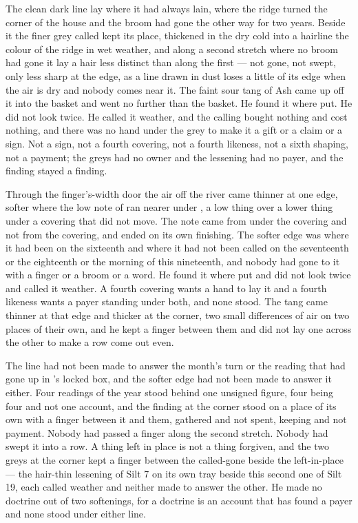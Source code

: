 The clean dark line lay where it had always lain, where the  ridge turned the corner of the house and the broom had gone the other way for two years. Beside it the finer grey called  kept its place, thickened in the dry cold into a hairline the colour of the ridge in wet weather, and along a second stretch where no broom had gone it lay a hair less distinct than along the first --- not gone, not swept, only less sharp at the edge, as a line drawn in dust loses a little of its edge when the air is dry and nobody comes near it. The faint sour tang of Ash came up off it into the basket and went no further than the basket. He found it where put. He did not look twice. He called it weather, and the calling bought nothing and cost nothing, and there was no hand under the grey to make it a gift or a claim or a sign. Not a sign, not a fourth covering, not a fourth likeness, not a sixth shaping, not a payment; the greys had no owner and the lessening had no payer, and the finding stayed a finding.

Through the finger's-width door the air off the river came thinner at one edge, softer where the low note of  ran nearer under , a low thing over a lower thing under a covering that did not move. The note came from under the covering and not from the covering, and ended on its own finishing. The softer edge was where it had been on the sixteenth and where it had not been called on the seventeenth or the eighteenth or the morning of this nineteenth, and nobody had gone to it with a finger or a broom or a word. He found it where put and did not look twice and called it weather. A fourth covering wants a hand to lay it and a fourth likeness wants a payer standing under both, and none stood. The tang came thinner at that edge and thicker at the corner, two small differences of air on two places of their own, and he kept a finger between them and did not lay one across the other to make a row come out even.

The line had not been made to answer the month's turn or the reading that had gone up  in 's locked box, and the softer edge had not been made to answer it either. Four readings of the year stood behind one unsigned figure, four being four and not one account, and the finding at the corner stood on a place of its own with a finger between it and them, gathered and not spent, keeping and not payment. Nobody had passed a finger along the second stretch. Nobody had swept it into a row. A thing left in place is not a thing forgiven, and the two greys at the corner kept a finger between the called-gone beside the left-in-place --- the hair-thin lessening of Silt 7 on its own tray beside this second one of Silt 19, each called weather and neither made to answer the other. He made no doctrine out of two softenings, for a doctrine is an account that has found a payer and none stood under either line.


